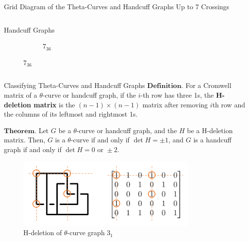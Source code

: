 \documentclass[final]{beamer}
\begin{document}
\begin{frame}[t]
\begin{alertblock}{Grid Diagram of the Theta-Curves and Handcuff Graphs Up to 7 Crossings}
\begin{columns}[t]
\begin{column}{0.3\textwidth}
\begin{alertblock}{Handcuff Graphs}
\begin{figure}
\begin{subfigure}{0.15\textwidth}
    \caption{$7_{36}$} 
    \end{subfigure}
  \end{figure}
  \end{alertblock}
  \end{column}
  \end{columns}
  \end{alertblock}

\begin{columns}[t]
  \begin{block}{Classifying Theta-Curves and Handcuff Graphs}
    $\mathbf{Definition.}$ For a Cromwell matrix of a $\theta$-curve or handcuff graph, if the $i$-th row has three 1s,
    the \textbf{H-deletion matrix} is the $(n{-}1)\times(n{-}1)$ matrix after removing $i$th row and the columns of its leftmost and rightmost 1s.

    \vspace{1em}
    $\mathbf{Theorem.}$ Let $G$ be a $\theta$-curve or handcuff graph, and the $H$ be a H-deletion matrix. Then,
    $G$ is a $\theta$-curve if and only if $\det{H} = \pm 1$, and $G$ is a handcuff graph if and only if $\det{H} = 0 \text{ or } \pm2$.
    \begin{figure}[h]
        \centering
        \includegraphics[width=0.8\textwidth]{figure/Hdeletion.png}
        \caption{H-deletion of $\theta$-curve graph $3_1$}
      \end{figure}
  \end{block}



\end{columns}
\end{frame}
\end{document}
